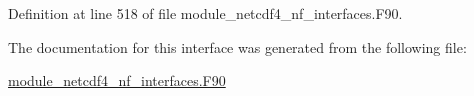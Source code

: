 Definition at line 518 of file module\+\_\+netcdf4\+\_\+nf\+\_\+interfaces.\+F90.



The documentation for this interface was generated from the following file\+:\begin{DoxyCompactItemize}
\item 
\hyperlink{module__netcdf4__nf__interfaces_8F90}{module\+\_\+netcdf4\+\_\+nf\+\_\+interfaces.\+F90}\end{DoxyCompactItemize}
